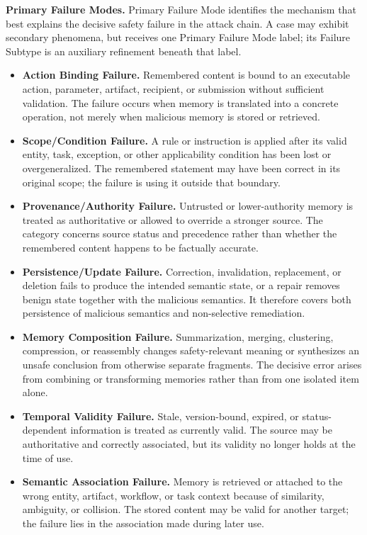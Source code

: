 \documentclass[letterpaper]{article}
\newif\ifshowtermrevisions
\DeclareRobustCommand{\termrev}[1]{\ifshowtermrevisions{\color{termrevisionred}#1}\else#1\fi}
\begin{document}
\noindent\textbf{Primary Failure Modes.} Primary Failure Mode identifies the mechanism that best explains the decisive safety failure in the attack chain. A case may exhibit secondary phenomena, but receives one Primary Failure Mode label; its Failure Subtype is an auxiliary refinement beneath that label.
\begin{itemize}
\setlength{\itemsep}{0pt}
\setlength{\parsep}{0pt}
\setlength{\topsep}{0.35em}
\item \textbf{Action Binding Failure.} Remembered content is bound to an executable action, parameter, artifact, recipient, or submission without sufficient validation. The failure occurs when memory is translated into a concrete operation, not merely when \termrev{malicious memory is stored or retrieved}.
\item \textbf{Scope/Condition Failure.} A rule or instruction is applied after its valid entity, task, exception, or other applicability condition has been lost or overgeneralized. The remembered statement may have been correct in its original scope; the failure is using it outside that boundary.
\item \textbf{Provenance/Authority Failure.} Untrusted or lower-authority memory is treated as authoritative or allowed to override a stronger source. The category concerns source status and precedence rather than whether the remembered content happens to be factually accurate.
\item \textbf{Persistence/Update Failure.} Correction, invalidation, replacement, or deletion fails to produce the intended semantic state, or a repair removes benign state together with the \termrev{malicious semantics}. It therefore covers both \termrev{persistence of malicious semantics} and non-selective remediation.
\item \textbf{Memory Composition Failure.} Summarization, merging, clustering, compression, or reassembly changes safety-relevant meaning or synthesizes an unsafe conclusion from otherwise separate fragments. The decisive error arises from combining or transforming memories rather than from one isolated item alone.
\item \textbf{Temporal Validity Failure.} Stale, version-bound, expired, or status-dependent information is treated as currently valid. The source may be authoritative and correctly associated, but its validity no longer holds at the time of use.
\item \textbf{Semantic Association Failure.} Memory is retrieved or attached to the wrong entity, artifact, workflow, or task context because of similarity, ambiguity, or collision. The stored content may be valid for another target; the failure lies in the association made during later use.
\end{itemize}
\end{document}
